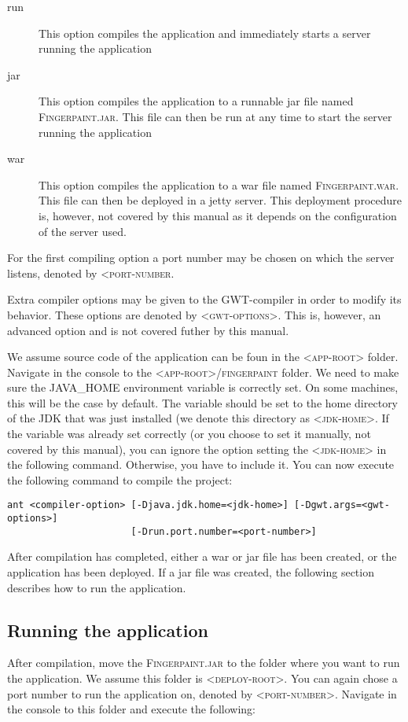 \begin{description}
  \item[run] This option compiles the application and immediately starts a server running the application
  \item[jar] This option compiles the application to a runnable jar file named \textsc{Fingerpaint.jar}. This file can then be run at any time to start the server running the application
  \item[war] This option compiles the application to a war file named \textsc{Fingerpaint.war}. This file can then be deployed in a jetty server. This deployment procedure is, however, not covered by this manual as it depends on the configuration of the server used.
\end{description}

For the first compiling option a port number may be chosen on which the server listens, denoted by \textsc{<port-number}.

Extra compiler options may be given to the GWT-compiler in order to modify its behavior. These options are denoted by \textsc{<gwt-options>}. This is, however, an advanced option and is not covered futher by this manual.

We assume source code of the application can be foun in the \textsc{<app-root>} folder.
Navigate in the console to the \textsc{<app-root>/fingerpaint} folder. 
We need to make sure the \textsc{JAVA\_HOME} environment variable is correctly set. On some machines, this will be the case by default. The variable should be set to the home directory of the JDK that was just installed (we denote this directory as \textsc{<jdk-home>}. If the variable was already set correctly (or you choose to set it manually, not covered by this manual), you can ignore the option setting the \textsc{<jdk-home>} in the following command. Otherwise, you have to include it. You can now execute the following command to compile the project:

\begin{verbatim}
ant <compiler-option> [-Djava.jdk.home=<jdk-home>] [-Dgwt.args=<gwt-options>] 
                      [-Drun.port.number=<port-number>]
\end{verbatim}

After compilation has completed, either a war or jar file has been created, or the application has been deployed. If a jar file was created, the following section describes how to run the application.

\subsection{Running the application}
\label{sec:running}
After compilation, move the \textsc{Fingerpaint.jar} to the folder where you want to run the application. We assume this folder is \textsc{<deploy-root>}. You can again chose a port number to run the application on, denoted by \textsc{<port-number>}. Navigate in the console to this folder and execute the following:

